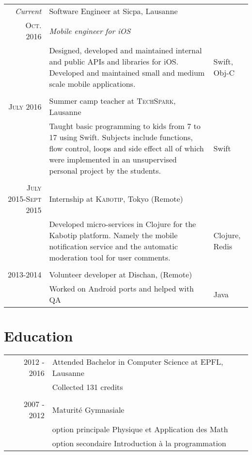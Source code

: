 \documentclass[a4paper,10pt]{article} %
\begin{document}
\begin{tabular}{r|p{8cm}|l}
\emph{Current} & Software Engineer at Sicpa, Lausanne\\
\textsc{Oct. 2016} & \emph{Mobile engineer for iOS}\\ 
& \footnotesize{Designed, developed and maintained internal and public APIs and libraries for iOS. Developed and maintained small and medium scale mobile applications.} & Swift, Obj-C\\
\multicolumn{2}{c}{} \\

\textsc{July 2016} & Summer camp teacher at \textsc{TechSpark}, Lausanne \emph{}\\
& \footnotesize{Taught basic programming to kids from 7 to 17 using Swift. Subjects include functions, flow control, loops and side effect all of which were implemented in an unsupervised personal project by the students.} & Swift\\
\multicolumn{2}{c}{}\\


\textsc{July 2015-Sept 2015} & Internship at \textsc{Kabotip}, Tokyo (Remote) \emph{}\\
& \footnotesize{Developed micro-services in Clojure for the Kabotip platform. Namely the mobile notification service and the automatic moderation tool for user comments.} & Clojure, Redis\\
\multicolumn{2}{c}{}\\


\textsc{2013-2014} & Volunteer developer at Dischan, (Remote)\\
& \footnotesize{Worked on Android ports and helped with QA} & Java
\end{tabular}


\section{Education}

\begin{tabular}{rl}	
2012 - 2016 & Attended Bachelor in Computer Science at EPFL, Lausanne\\
& \footnotesize{Collected 131 credits}\\
\multicolumn{2}{c}{}\\


2007 - 2012 & Maturité Gymnasiale\\ & option principale Physique et Application des Math\\ & option secondaire Introduction à la programmation\\
\end{tabular}
\end{document}
